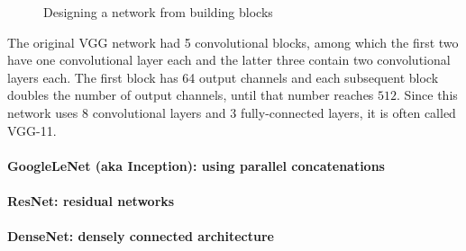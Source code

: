 \begin{figure}[hpt]
	\centering
	
	\caption{Designing a network from building blocks}
	\label{fig:vgg}
\end{figure}

The original VGG network had 5 convolutional blocks, among which the first two have one convolutional layer each and the latter three contain two convolutional layers each. The first block has 64 output channels and each subsequent block doubles the number of output channels, until that number reaches $512$. Since this network uses $8$ convolutional layers and $3$ fully-connected layers, it is often called VGG-11.

\paragraph{GoogleLeNet (aka Inception): using parallel concatenations}

\paragraph{ResNet: residual networks}

\paragraph{DenseNet: densely connected architecture}

